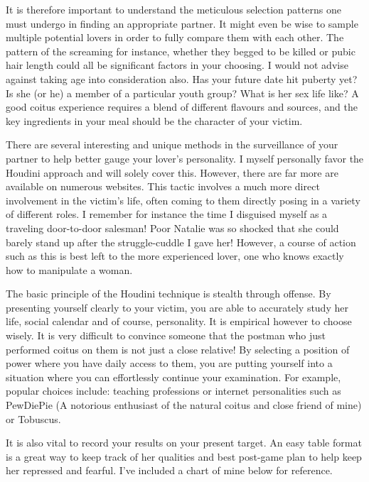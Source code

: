 It is therefore important to understand the meticulous selection patterns one 
must undergo in finding an appropriate partner. It might even be wise to sample 
multiple potential lovers in order to fully compare them with each other. The 
pattern of the screaming for instance, whether they begged to be killed or 
pubic hair length could all be significant factors in your choosing. I would 
not advise against taking age into consideration also. Has your future date hit 
puberty yet? Is she (or he) a member of a particular youth group? What is her 
sex life like? A good coitus experience requires a blend of different flavours 
and sources, and the key ingredients in your meal should be the character of 
your victim.

There are several interesting and unique methods in the surveillance of your 
partner to help better gauge your lover’s personality. I myself personally 
favor the Houdini approach and will solely cover this. However, there are far 
more are available on numerous websites. This tactic involves a much more 
direct involvement in the victim’s life, often coming to them directly posing 
in a variety of different roles. I remember for instance the time I disguised 
myself as a traveling door-to-door salesman! Poor Natalie was so shocked that 
she could barely stand up after the struggle-cuddle I gave her! However, a 
course of action such as this is best left to the more experienced lover, one 
who knows exactly how to manipulate a woman.

The basic principle of the Houdini technique is stealth through offense. By 
presenting yourself clearly to your victim, you are able to accurately study 
her life, social calendar and of course, personality. It is empirical however 
to choose wisely. It is very difficult to convince someone that the postman who 
just performed coitus on them is not just a close relative!  By selecting a 
position of power where you have daily access to them, you are putting yourself 
into a situation where you can effortlessly continue your examination. For 
example, popular choices include: teaching professions or internet 
personalities such as PewDiePie (A notorious enthusiast of the natural coitus 
and close friend of mine) or Tobuscus.

It is also vital to record your results on your present target. An easy table 
format is a great way to keep track of her qualities and best post-game plan to 
help keep her repressed and fearful. I’ve included a chart of mine below for 
reference.


